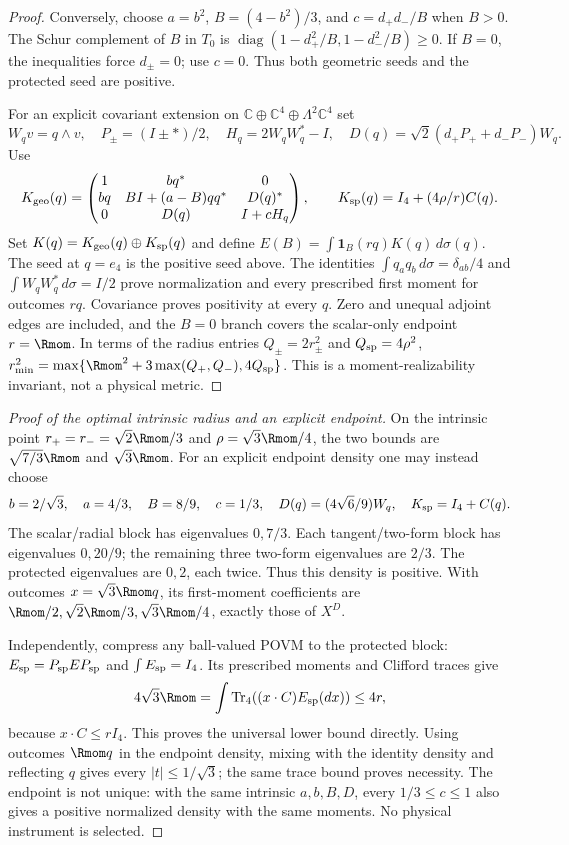 \documentclass[11pt,a4paper]{article}
\begin{document}
\begin{proof}
Conversely, choose $a=b^2$, $B=(4-b^2)/3$, and
$c=d_+d_-/B$ when $B>0$. The Schur complement of $B$ in $T_0$ is
$\operatorname{diag}(1-d_+^2/B,1-d_-^2/B)\ge0$.
If $B=0$, the inequalities force $d_\pm=0$; use $c=0$.
Thus both geometric seeds and the protected seed are positive.

For an explicit covariant extension on
$\mathbb C\oplus\mathbb C^4\oplus\Lambda^2\mathbb C^4$ set
\[
 W_qv=q\wedge v,\quad P_\pm=(I\pm *)/2,\quad
 H_q=2W_qW_q^*-I,\quad
 D(q)=\sqrt2(d_+P_++d_-P_-)W_q.
\]
Use
\[
 K_{\rm geo}(q)=
 \begin{pmatrix}
 1&bq^*&0\\
 bq&B I+(a-B)qq^*&D(q)^*\\
 0&D(q)&I+cH_q
 \end{pmatrix},
 \qquad
 K_{\rm sp}(q)=I_4+(4\rho/r)C(q).
\]
Set $K(q)=K_{\rm geo}(q)\oplus K_{\rm sp}(q)$ and define
$E(B)=\int\mathbf1_B(rq)K(q)\,d\sigma(q)$.
The seed at $q=e_4$ is the positive seed above.
The identities
$\int q_aq_b\,d\sigma=\delta_{ab}/4$ and
$\int W_qW_q^*\,d\sigma=I/2$
prove normalization and every prescribed first moment for outcomes $rq$.
Covariance proves positivity at every $q$. Zero and unequal adjoint edges
are included, and the $B=0$ branch covers the scalar-only endpoint $r=\Rmom$.
In terms of the radius entries $Q_\pm=2r_\pm^2$ and $Q_{\rm sp}=4\rho^2$,
$r_{\min}^2=\max\{\Rmom^2+3\max(Q_+,Q_-),4Q_{\rm sp}\}$.
This is a moment-realizability invariant, not a physical metric.
\end{proof}

\begin{proof}[Proof of the optimal intrinsic radius and an explicit endpoint]
On the intrinsic point $r_+=r_-=\sqrt2\Rmom/3$ and
$\rho=\sqrt3\Rmom/4$, the two bounds are
$\sqrt{7/3}\Rmom$ and $\sqrt3\Rmom$.
For an explicit endpoint density one may instead choose
\[
 b=2/\sqrt3,\quad a=4/3,\quad B=8/9,\quad
 c=1/3,\quad D(q)=(4\sqrt6/9)W_q,\quad K_{\rm sp}=I_4+C(q).
\]
The scalar/radial block has eigenvalues $0,7/3$.
Each tangent/two-form block has eigenvalues $0,20/9$; the remaining
three two-form eigenvalues are $2/3$. The protected eigenvalues are $0,2$,
each twice. Thus this density is positive.
With outcomes $x=\sqrt3\Rmom q$, its first-moment coefficients are
$\Rmom/2,\sqrt2\Rmom/3,\sqrt3\Rmom/4$, exactly those of $X^D$.

Independently, compress any ball-valued POVM to the protected block:
$E_{\rm sp}=P_{\rm sp}EP_{\rm sp}$ and $\int E_{\rm sp}=I_4$.
Its prescribed moments and Clifford traces give
\[
 4\sqrt3\Rmom
 =\int\operatorname{Tr}_4((x\cdot C)E_{\rm sp}(dx))
 \le4r,
\]
because $x\cdot C\le rI_4$. This proves the universal lower bound directly.
Using outcomes $\Rmom q$ in the endpoint density, mixing with the identity
density and reflecting $q$ gives every $|t|\le1/\sqrt3$; the same trace
bound proves necessity. The endpoint is not unique: with the same intrinsic $a,b,B,D$, every
$1/3\le c\le1$ also gives a positive normalized density with the same
moments. No physical instrument is selected.
\end{proof}
\end{document}
